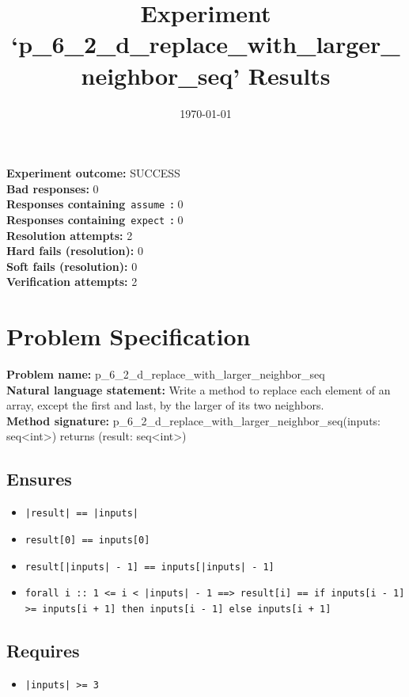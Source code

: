 \documentclass{article}
\begin{document}
\title{Experiment `p\_6\_2\_d\_replace\_with\_larger\_neighbor\_seq' Results}
\author{\today}
\date{}
\maketitle
\textbf{Experiment outcome: }SUCCESS
\\\textbf{Bad responses: }0
\\\textbf{Responses containing}~\texttt{assume}~\textbf{: }0
\\\textbf{Responses containing}~\texttt{expect}~\textbf{: }0
\\\textbf{Resolution attempts: }2
\\\textbf{Hard fails (resolution): }0
\\\textbf{Soft fails (resolution): }0
\\\textbf{Verification attempts: }2
\section*{Problem Specification}
\textbf{Problem name: }p\_6\_2\_d\_replace\_with\_larger\_neighbor\_seq
\\\textbf{Natural language statement: }Write a method to replace each element of an array, except the first and last, by the larger of its two neighbors.
\\\textbf{Method signature: }p\_6\_2\_d\_replace\_with\_larger\_neighbor\_seq(inputs: seq<int>) returns (result: seq<int>)
\subsection*{Ensures}
\begin{itemize}
\item \texttt{|result| == |inputs|}
\item \texttt{result[0] == inputs[0]}
\item \texttt{result[|inputs| - 1] == inputs[|inputs| - 1]}
\item \texttt{forall i :: 1 <= i < |inputs| - 1 ==> result[i] == if inputs[i - 1] >= inputs[i + 1] then inputs[i - 1] else inputs[i + 1]}
\end{itemize}
\subsection*{Requires}
\begin{itemize}
\item \texttt{|inputs| >= 3}
\end{itemize}
\clearpage
\end{document}
